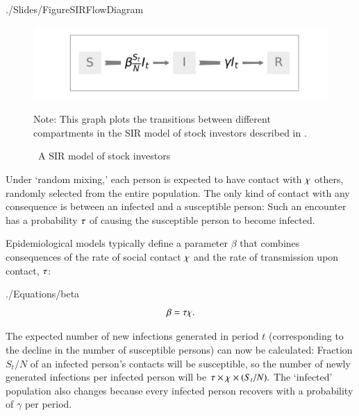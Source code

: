 \begin{verbatimwrite}{./Slides/FigureSIRFlowDiagram}%
	\begin{figure}[!ht] \centering  %
		\caption{ ~A SIR model of stock investors}
		\label{fig:sir_diagram}
		\centerline{\includegraphics[width=\textwidth]{./figures/flow_diagram}}
		\begin{flushleft}
			{\footnotesize Note: This graph plots the transitions between different compartments in the SIR model of stock investors described in \cite{shiller1989survey}. }
		\end{flushleft}
	\end{figure}
\end{verbatimwrite}%


Under `random mixing,' each person is expected to have contact with $\contactNum$ others, randomly selected from the entire population.  The only kind of contact with any consequence is between an infected and a susceptible person: Such an encounter has a probability $\tranProb$ of causing the susceptible person to become infected.

Epidemiological models typically define a parameter $\beta$ that combines consequences of the rate of social contact $\contactNum$ and the rate of transmission upon  contact, $\tranProb$:
\begin{verbatimwrite}{./Equations/beta}
\begin{equation}
	\label{eq:beta}
    \beta  = \tranProb \contactNum.
\end{equation}
\end{verbatimwrite}


The expected number of new infections generated in period $t$ (corresponding to the decline in the number of susceptible persons) can now be calculated: Fraction $S_{t}/N$ of an infected person's contacts will be susceptible, so the number of newly generated infections per infected person will be $\tranProb \times \contactNum \times (S_{t}/N).$ The `infected' population also changes because every infected person recovers with a probability of $\gamma$ per period.

